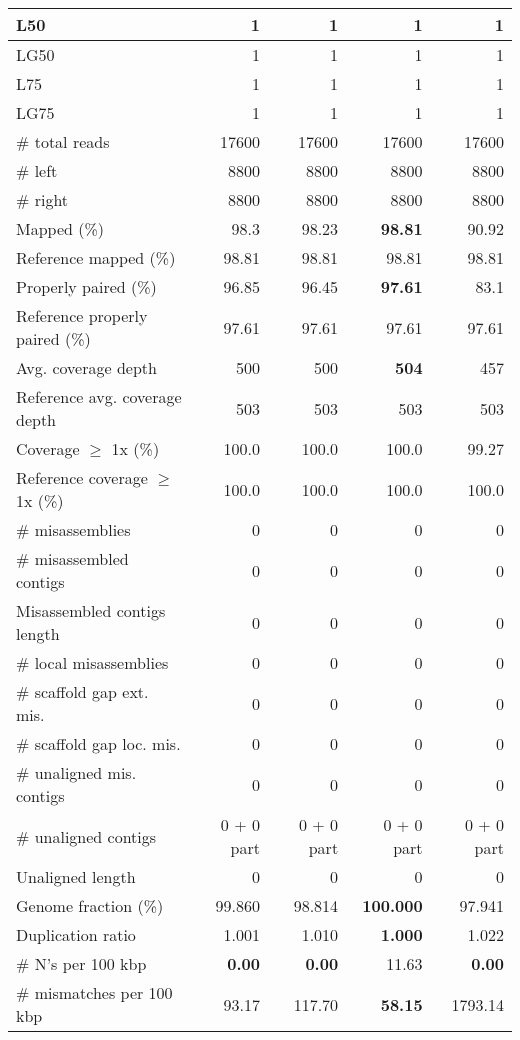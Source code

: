 \documentclass[12pt,a4paper]{article}
\begin{document}
\begin{table}[ht]
\begin{center}
\begin{tabular}{|l*{4}{|r}|}
L50 & 1 & 1 & 1 & 1 \\ \hline
LG50 & 1 & 1 & 1 & 1 \\ \hline
L75 & 1 & 1 & 1 & 1 \\ \hline
LG75 & 1 & 1 & 1 & 1 \\ \hline
\# total reads & 17600 & 17600 & 17600 & 17600 \\ \hline
\# left & 8800 & 8800 & 8800 & 8800 \\ \hline
\# right & 8800 & 8800 & 8800 & 8800 \\ \hline
Mapped (\%) & 98.3 & 98.23 & {\bf 98.81} & 90.92 \\ \hline
Reference mapped (\%) & 98.81 & 98.81 & 98.81 & 98.81 \\ \hline
Properly paired (\%) & 96.85 & 96.45 & {\bf 97.61} & 83.1 \\ \hline
Reference properly paired (\%) & 97.61 & 97.61 & 97.61 & 97.61 \\ \hline
Avg. coverage depth & 500 & 500 & {\bf 504} & 457 \\ \hline
Reference avg. coverage depth & 503 & 503 & 503 & 503 \\ \hline
Coverage $\geq$ 1x (\%) & 100.0 & 100.0 & 100.0 & 99.27 \\ \hline
Reference coverage $\geq$ 1x (\%) & 100.0 & 100.0 & 100.0 & 100.0 \\ \hline
\# misassemblies & 0 & 0 & 0 & 0 \\ \hline
\# misassembled contigs & 0 & 0 & 0 & 0 \\ \hline
Misassembled contigs length & 0 & 0 & 0 & 0 \\ \hline
\# local misassemblies & 0 & 0 & 0 & 0 \\ \hline
\# scaffold gap ext. mis. & 0 & 0 & 0 & 0 \\ \hline
\# scaffold gap loc. mis. & 0 & 0 & 0 & 0 \\ \hline
\# unaligned mis. contigs & 0 & 0 & 0 & 0 \\ \hline
\# unaligned contigs & 0 + 0 part & 0 + 0 part & 0 + 0 part & 0 + 0 part \\ \hline
Unaligned length & 0 & 0 & 0 & 0 \\ \hline
Genome fraction (\%) & 99.860 & 98.814 & {\bf 100.000} & 97.941 \\ \hline
Duplication ratio & 1.001 & 1.010 & {\bf 1.000} & 1.022 \\ \hline
\# N's per 100 kbp & {\bf 0.00} & {\bf 0.00} & 11.63 & {\bf 0.00} \\ \hline
\# mismatches per 100 kbp & 93.17 & 117.70 & {\bf 58.15} & 1793.14 \\ \hline

\end{tabular}
\end{center}
\end{table}
\end{document}

